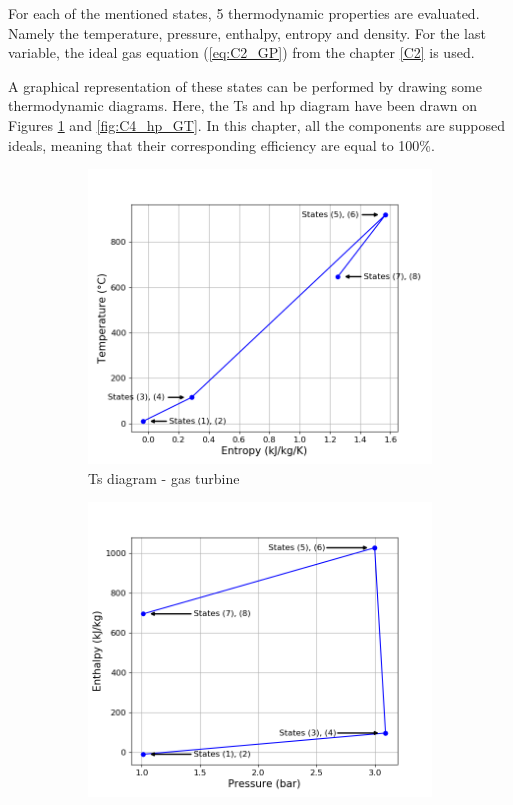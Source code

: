 For each of the mentioned states, 5 thermodynamic properties are evaluated. Namely the temperature, pressure, enthalpy, entropy and density. For the last variable, the ideal gas equation (\ref{eq:C2_GP}) from the chapter \ref{C2} is used. 

A graphical representation of these states can be performed by drawing some thermodynamic diagrams. Here, the Ts and hp diagram have been drawn on Figures \ref{fig:C4_Ts_GT} and \ref{fig:C4_hp_GT}. In this chapter, all the components are supposed ideals, meaning that their corresponding efficiency are equal to 100\%.

\begin{figure}[h]
     \centering
     \begin{subfigure}[b]{0.4\textwidth}
         \centering
         \includegraphics[width=\textwidth]{Ts_GT}
         \caption{Ts diagram - gas turbine}
         \label{fig:C4_Ts_GT}
     \end{subfigure}
     \begin{subfigure}[b]{0.4\textwidth}
         \centering
         \includegraphics[width=\textwidth]{hp_GT}

\end{subfigure}
\end{figure}
